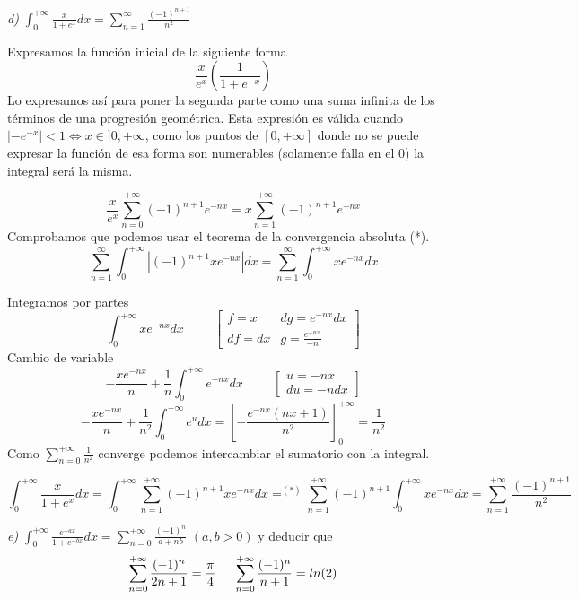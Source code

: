 
\textit{d)} $\int_0^{+\infty} \frac{x}{1+e^x}dx = \sum_{n=1}^{\infty} \frac{(-1)^{n+1}}{n^2}$

Expresamos la función inicial de la siguiente forma
\[ \frac{x}{e^x} \left( \frac{1}{1+e^{-x}} \right)\]
Lo expresamos así para poner la segunda parte como una suma infinita de los términos de una progresión geométrica. Esta expresión es válida cuando 
$|-e^{-x}| < 1 \Leftrightarrow x \in ]0, +\infty$, como los puntos de $[0, +\infty]$ donde no se puede expresar la función de esa forma son numerables (solamente falla en el $0$) la integral será la misma.

\[ \frac{x}{e^x} \sum_{n=0}^{+\infty} (-1)^{n+1}e^{-nx} = x \sum_{n=1}^{+\infty} (-1)^{n+1}e^{-nx}
\]
Comprobamos que podemos usar el teorema de la convergencia absoluta (*).   
\[ \sum_{n=1}^{\infty} \int_0^{+\infty} \left| (-1)^{n+1}xe^{-nx} \right| dx
= \sum_{n=1}^{\infty} \int_0^{+\infty} xe^{-nx} dx
\]

Integramos por partes 
\[ \int_0^{+\infty} xe^{-nx}dx \hspace{1cm}
	\begin{bmatrix}
	f  = x    &  dg = e^{-nx}dx \\
	df = dx   &   g = \frac{e^{-nx}}{-n}
	\end{bmatrix}
\]
Cambio de variable
\[ -\frac{xe^{-nx}}{n} + \frac{1}{n} \int_0^{+\infty}e^{-nx}dx \hspace{1cm} 
	\begin{bmatrix}
	u = -nx   \\
	du = -ndx 
	\end{bmatrix}
\]
\[ -\frac{xe^{-nx}}{n} + \frac{1}{n^2} \int_0^{+\infty}e^udx 
=  \left[ -\frac{e^{-nx}(nx+1)}{n^2} \right]_0^{+\infty} 
= \frac{1}{n^2}
\]
Como $\sum_{n=0}^{+\infty} \frac{1}{n^2}$ converge podemos intercambiar el sumatorio con la integral.

\[ \int_0^{+\infty} \frac{x}{1+e^x}dx 
 = \int_0^{+\infty} \sum_{n=1}^{+\infty} (-1)^{n+1}xe^{-nx}   dx
 =^{(*)} \sum_{n=1}^{+\infty} (-1)^{n+1}  \int_0^{+\infty} xe^{-nx} dx
 = \sum_{n=1}^{+\infty} \frac{(-1)^{n+1}}{n^2}
\]





\textit{e)} $\int_0^{+\infty} \frac{e^{-ax}}{1+e^{-bx}}dx = \sum_{n=0}^{+\infty} \frac{(-1)^n}{a+nb}$
$(a,b>0)$ y deducir que 
\[ \sum_{n=0}^{+\infty} \frac{(-1)^n}{2n+1} = \frac{\pi}{4} \hspace{0.5cm}
   \sum_{n=0}^{+\infty} \frac{(-1)^n}{n+1}  = ln(2) 
\]

